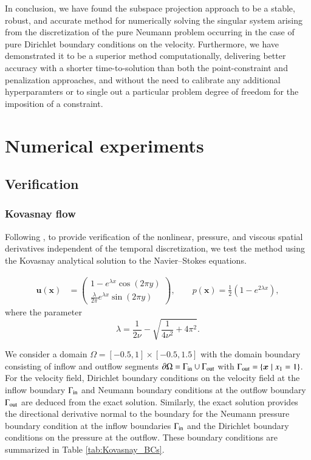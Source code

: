 In conclusion, we have found the subspace projection approach to be a stable, robust, and accurate method for numerically solving the singular system arising from the discretization of the pure Neumann problem occurring in the case of pure Dirichlet boundary conditions on the velocity.
Furthermore, we have demonstrated it to be a superior method computationally, delivering better accuracy with a shorter time-to-solution than both the point-constraint and penalization approaches, and without the need to calibrate any additional hyperparamters or to single out a particular problem degree of freedom for the imposition of a constraint.

\section{Numerical experiments}
\label{sec:numerical_experiments}

\subsection{Verification}

\subsubsection{Kovasnay flow}%
\label{ssub:kovasnay_flow}


Following \cite{hesthaven_nodal_2008}, to provide verification of the nonlinear, pressure, and viscous spatial derivatives independent of the temporal discretization, we test the method using the Kovasnay analytical solution to the Navier--Stokes equations.

\begin{equation}
  \begin{aligned}
    \bm{u(\bm{x})} &= 
    \begin{pmatrix}
      1 - e^{\lambda x} \cos(2 \pi y) \\
      \frac{\lambda}{2\pi} e^{\lambda x} \sin(2\pi y)
    \end{pmatrix}, \qquad
    p(\bm{x}) = \frac{1}{2} \left(1 - e^{2\lambda x}\right),
  \end{aligned}
  \label{eq:kovasnay_flow}
\end{equation}
where the parameter 
\begin{equation}
\lambda = \frac{1}{2\nu} - \sqrt{\frac{1}{4\nu^2} + 4\pi^2}.
\end{equation}

We consider a domain $\Omega = [-0.5,1]\times [-0.5, 1.5]$ with the domain boundary consisting of inflow and outflow segments $\partial\Omega = \Gamma_{\text{in}}\cup \Gamma_{\text{out}}$ with $\Gamma_{\text{out}} = \left\{\bm{x}\mid x_1 = 1\right\}$. 
For the velocity field, Dirichlet boundary conditions on the velocity field at the inflow boundary $\Gamma_{\text{in}}$ and Neumann boundary conditions at the outflow boundary $\Gamma_{\text{out}}$ are deduced from the exact solution. 
Similarly, the exact solution provides the directional derivative normal to the boundary for the Neumann pressure boundary condition at the inflow boundaries $\Gamma_{\text{in}}$ and the Dirichlet boundary conditions on the pressure at the outflow. 
These boundary conditions are summarized in Table \ref{tab:Kovasnay_BCs}. \\

